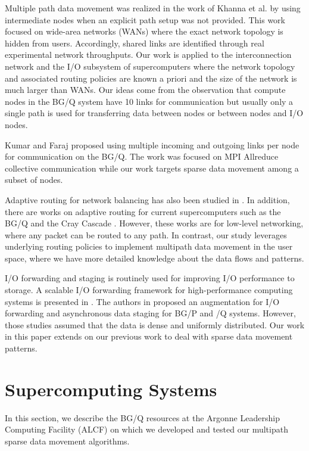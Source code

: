 \documentclass[final,5p,times]{elsarticle}
\begin{document}
Multiple path data movement was realized in the work of Khanna et al. \cite{Proxies:Gaurav} by using intermediate nodes when an explicit path setup was not provided. This work focused on wide-area networks (WANs) where the exact network topology is hidden from users. Accordingly, shared links are identified through real experimental network throughputs. Our work is applied to the interconnection network and the I/O subsystem of supercomputers where the network topology and associated routing policies are known a priori and the size of the network is much larger than WANs. Our ideas come from the observation that compute nodes in the BG/Q system have 10 links for communication but usually only a single path is used for transferring data between nodes or between nodes and I/O nodes.

Kumar and Faraj \cite{Kumar:Allreduce} proposed using multiple incoming and outgoing links per node for communication on the BG/Q. The work was focused on MPI Allreduce collective communication while our work targets sparse data movement among a subset of nodes.

Adaptive routing for network balancing has also been studied in \cite{Valiant:Routing,singh2003:goal}. In addition, there are works on adaptive routing for current supercomputers such as the BG/Q \cite{Chen:BGQ} and the Cray Cascade \cite{garcia2013:CrayDragonfly}. However, these works are for low-level networking, where any packet can be routed to any path. In contrast, our study leverages underlying routing policies to implement multipath data movement in the user space, where we have more detailed knowledge about the data flows and patterns.

I/O forwarding and staging is routinely used for improving I/O performance to storage. A scalable I/O forwarding framework for high-performance computing systems is presented in \cite{Ali:IOForwarding}. The authors in \cite{Vishwanath:IOForwarding,Vishwanath:GLEAN}  proposed an augmentation for I/O forwarding and asynchronous data staging for BG/P and /Q systems. However, those studies assumed that the data is dense and uniformly distributed. Our work in this paper extends on our previous work \cite{Vishwanath:GLEAN} to deal with sparse data movement patterns.

\section{Supercomputing Systems}
\label{sec:systems}

In this section, we describe the BG/Q resources at the Argonne Leadership Computing Facility (ALCF) on which we developed and tested our multipath sparse data movement algorithms.
\end{document}
